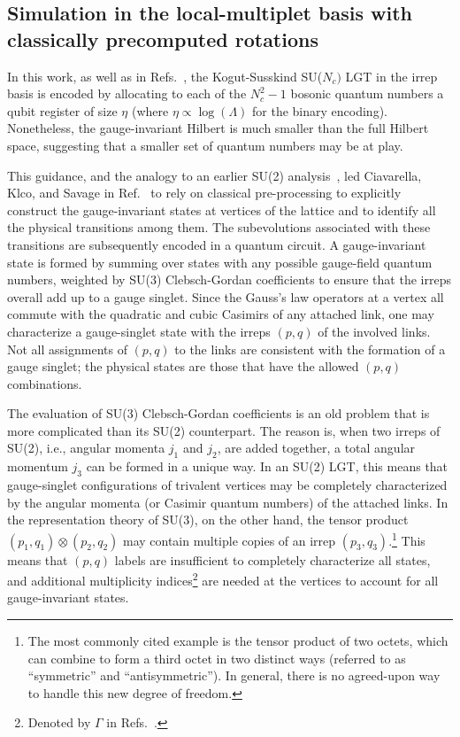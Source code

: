 \documentclass[aps,prd,twocolumn,showpacs,groupedaddress,superscriptaddress,nofootinbib,floatfix,preprintnumbers,longbibliography]{revtex4-1}
\begin{document}
%
\subsection{Simulation in the local-multiplet basis with classically precomputed rotations}
%
\noindent 
In this work, as well as in Refs.~\cite{Kan:2021xfc,Rhodes:2024zbr}, the Kogut-Susskind SU($N_c)$ LGT in the irrep basis is encoded by allocating to each of the $N_c^2-1$ bosonic quantum numbers a qubit register of size $\eta$ (where $\eta \propto \log(\Lambda)$ for the binary encoding). Nonetheless, the gauge-invariant Hilbert is much smaller than the full Hilbert space, suggesting that a smaller set of quantum numbers may be at play.

This guidance, and the analogy to an earlier SU(2) analysis~\cite{Klco:2019evd}, led Ciavarella, Klco, and Savage in Ref.~\cite{Ciavarella:2021nmj} to rely on classical pre-processing to explicitly construct the gauge-invariant states at vertices of the lattice and to identify all the physical transitions among them. The subevolutions associated with these transitions are subsequently encoded in a quantum circuit. A gauge-invariant state is formed by summing over states with any possible gauge-field quantum numbers, weighted by SU(3) Clebsch-Gordan coefficients to ensure that the irreps overall add up to a gauge singlet. Since the Gauss's law operators at a vertex all commute with the quadratic and cubic Casimirs of any attached link, one may characterize a gauge-singlet state with the irreps $(p,q)$ of the involved links. Not all assignments of $(p,q)$ to the links are consistent with the formation of a gauge singlet; the physical states are those that have the allowed $(p,q)$ combinations.

The evaluation of SU(3) Clebsch-Gordan coefficients is an old problem that is more complicated than its SU(2) counterpart. The reason is, when two irreps of SU(2), i.e., angular momenta $j_1$ and $j_2$, are added together, a total angular momentum $j_3$ can be formed in a unique way. In an SU(2) LGT, this means that gauge-singlet configurations of trivalent vertices may be completely characterized by the angular momenta (or Casimir quantum numbers) of the attached links. In the representation theory of SU(3), on the other hand, the tensor product $(p_1,q_1) \otimes (p_2,q_2)$ may contain multiple copies of an irrep $(p_3,q_3)$.\footnote{The most commonly cited example is the tensor product of two octets, which can combine to form a third octet in two distinct ways (referred to as ``symmetric'' and ``antisymmetric''). In general, there is no agreed-upon way to handle this new degree of freedom.} This means that $(p,q)$ labels are insufficient to completely characterize all states, and additional multiplicity indices\footnote{Denoted by $\Gamma$ in Refs.~\cite{Ciavarella:2021nmj,Balaji:2025afl}.} are needed at the vertices to account for all gauge-invariant states. 
\end{document}
